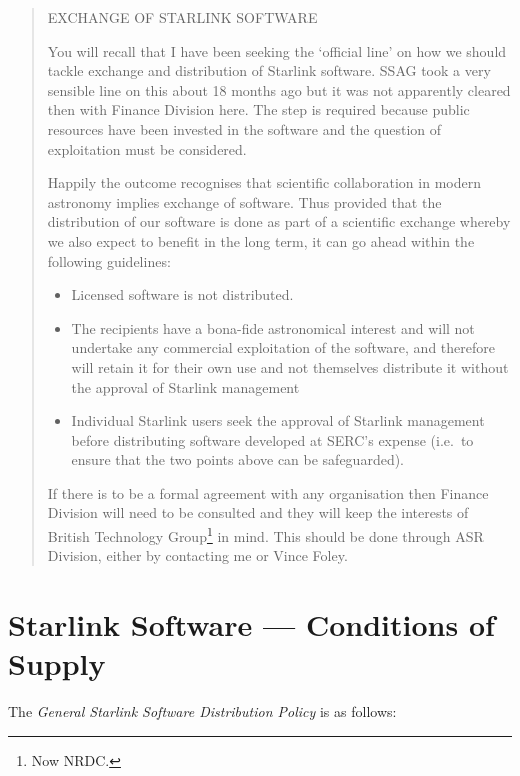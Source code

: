 \begin{quote}
\begin{center}
EXCHANGE OF STARLINK SOFTWARE
\end{center}

You will recall that I have been seeking the `official line' on how we should
tackle exchange and distribution of Starlink software.
SSAG took a very sensible line on this about 18 months ago but it was not
apparently cleared then with Finance Division here.
The step is required because public resources have been invested in the
software and the question of exploitation must be considered.

Happily the outcome recognises that scientific collaboration in modern astronomy
implies exchange of software.
Thus provided that the distribution of our software is done as part of a
scientific exchange whereby we also expect to benefit in the long term, it can
go ahead within the following guidelines:
\begin{itemize}
\item Licensed software is not distributed.
\item The recipients have a bona-fide astronomical interest and will not
 undertake any commercial exploitation of the software, and therefore will
 retain it for their own use and not themselves distribute it without the
 approval of Starlink management
\item Individual Starlink users seek the approval of Starlink management
 before distributing software developed at SERC's expense (i.e.\ to ensure that
 the two points above can be safeguarded).
\end{itemize}
If there is to be a formal agreement with any organisation then Finance Division
will need to be consulted and they will keep the interests of British Technology
Group\footnote{Now NRDC.} in mind.
This should be done through ASR Division, either by contacting me or Vince
Foley.
\end{quote}

\newpage

\section{Starlink Software --- Conditions of Supply}
\label{se:cons}

The {\em General Starlink Software Distribution Policy} is as follows:

